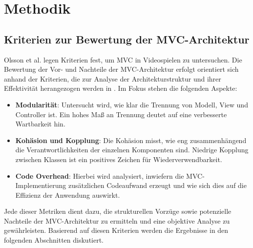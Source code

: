 
\chapter{Methodik}
\label{chap:methodik}

\section{Kriterien zur Bewertung der MVC-Architektur}

Olsson et al. \cite{olsson2015evolution} legen Kriterien fest, um 
\ac{MVC} in Videospielen zu untersuchen.
Die Bewertung der Vor- und Nachteile der \ac{MVC}-Architektur erfolgt orientiert 
sich anhand der Kriterien, die zur Analyse der Architekturstruktur und ihrer 
Effektivität herangezogen werden in \cite{olsson2015evolution}. Im Fokus stehen 
die folgenden Aspekte:

\begin{itemize}
    \item \textbf{Modularität}: Untersucht wird, wie klar die Trennung 
    von Modell, View und Controller ist. Ein hohes Maß an Trennung 
    deutet auf eine verbesserte Wartbarkeit hin.
    
    \item \textbf{Kohäsion und Kopplung}: Die Kohäsion misst, wie 
    eng zusammenhängend die Verantwortlichkeiten der einzelnen 
    Komponenten sind. Niedrige Kopplung zwischen Klassen ist ein 
    positives Zeichen für Wiederverwendbarkeit.
    
    \item \textbf{Code Overhead}: Hierbei wird analysiert, inwiefern 
    die \ac{MVC}-Implementierung zusätzlichen Codeaufwand erzeugt und 
    wie sich dies auf die Effizienz der Anwendung auswirkt.
\end{itemize}

Jede dieser Metriken dient dazu, die strukturellen Vorzüge sowie 
potenzielle Nachteile der \ac{MVC}-Architektur zu ermitteln und eine 
objektive Analyse zu gewährleisten. Basierend auf diesen Kriterien 
werden die Ergebnisse in den folgenden Abschnitten diskutiert.